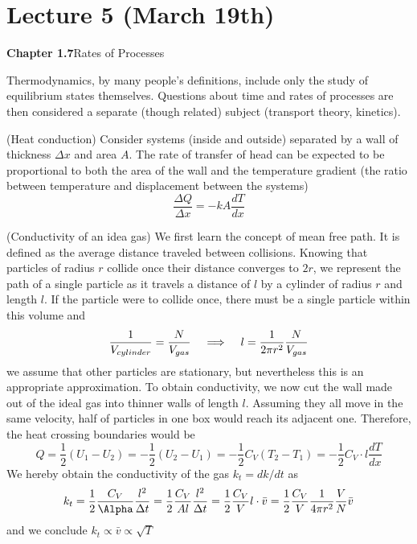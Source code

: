 \section{Lecture 5 (March 19th)}
{\bf Chapter 1.7}\hspace{2ex}Rates of Processes
\\
\begin{rmk}
Thermodynamics, by many people's definitions, include only the study of equilibrium states themselves. Questions about time and rates of processes are then considered a separate (though related) subject (transport theory, kinetics). 
\end{rmk}
\vspace{2ex}
\begin{defi}
 (Heat conduction) Consider systems (inside and outside) separated by a wall of thickness $\Delta x$ and area $A$. The rate of transfer of head can be expected to be proportional to both the area of the wall and the temperature gradient (the ratio between temperature and displacement between the systems)
 \[\dfrac{\Delta Q}{\Delta x}=-kA\dfrac{dT}{dx}\] 
\end{defi}
\vspace{2ex}
\begin{defi}
 (Conductivity of an idea gas) We first learn the concept of mean free path. It is defined as the average distance traveled between collisions. Knowing that particles of radius $r$ collide once their distance converges to $2r$, we represent the path of a single particle as it travels a distance of $l$ by a cylinder of radius $r$ and length $l$. If the particle were to collide once, there must be a single particle within this volume and
 \[\dfrac{1}{V_{cylinder}}=\dfrac{N}{V_{gas}}\hspace{2ex}\implies \hspace{2ex}l=\dfrac{1}{2\pi r^2}\dfrac{N}{V_{gas}}\]
we assume that other particles are stationary, but nevertheless this is an appropriate approximation. To obtain conductivity, we now cut the wall made out of the ideal gas into thinner walls of length $l$. Assuming they all move in the same velocity, half of particles in one box would reach its adjacent one. Therefore, the heat crossing boundaries would be 
\[Q=\dfrac{1}{2}(U_1-U_2)=-\dfrac{1}{2}(U_2-U_1)=-\dfrac{1}{2}C_{V}(T_2-T_1)=-\dfrac{1}{2}C_V\cdot l \dfrac{d T}{d x} \]
We hereby obtain the conductivity of the gas $k_{t}=dk/dt$ as 
\[k_{t}=\dfrac{1}{2}\dfrac{C_{V}}{\Alpha }\dfrac{l^2}{\Delta t}=\dfrac{1}{2}\dfrac{C_{V}}{Al}\dfrac{l^2}{\Delta t}=\dfrac{1}{2}\dfrac{C_{V}}{V}l\cdot \bar{v}=\dfrac{1}{2}\dfrac{C_{V}}{V}\dfrac{1}{4\pi r^2}\dfrac{V}{N}\bar{v}\]
and we conclude $k_{t}\propto\bar{v}\propto\sqrt{T}$
\end{defi}
